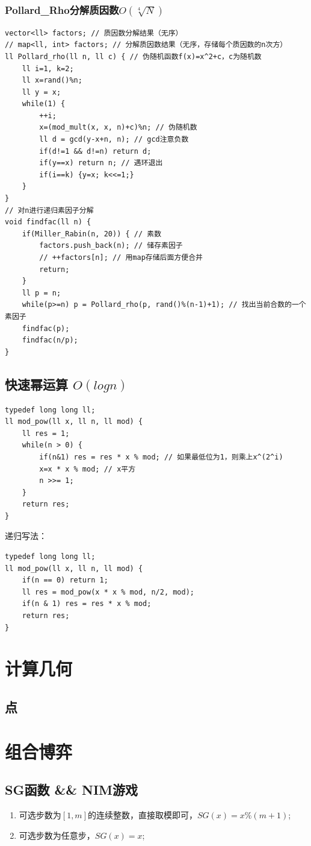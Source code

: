 \documentclass[a4paper]{ctexrep}
\begin{document}
\subsection{Pollard\_Rho分解质因数$O(\sqrt[4] N)$}
\begin{lstlisting}
vector<ll> factors; // 质因数分解结果（无序）
// map<ll, int> factors; // 分解质因数结果（无序，存储每个质因数的n次方）
ll Pollard_rho(ll n, ll c) { // 伪随机函数f(x)=x^2+c，c为随机数
	ll i=1, k=2;
	ll x=rand()%n;
	ll y = x;
	while(1) {
		++i;
		x=(mod_mult(x, x, n)+c)%n; // 伪随机数
		ll d = gcd(y-x+n, n); // gcd注意负数
		if(d!=1 && d!=n) return d;
		if(y==x) return n; // 遇环退出
		if(i==k) {y=x; k<<=1;}
	}
}
// 对n进行递归素因子分解
void findfac(ll n) {
	if(Miller_Rabin(n, 20)) { // 素数
		factors.push_back(n); // 储存素因子
		// ++factors[n]; // 用map存储后面方便合并
		return;
	}
	ll p = n;
	while(p>=n) p = Pollard_rho(p, rand()%(n-1)+1); // 找出当前合数的一个素因子
	findfac(p);
	findfac(n/p);
}
\end{lstlisting}

\section{快速幂运算 $O(log n)$}
\begin{lstlisting}
typedef long long ll;
ll mod_pow(ll x, ll n, ll mod) {
	ll res = 1;
	while(n > 0) {
		if(n&1) res = res * x % mod; // 如果最低位为1，则乘上x^(2^i)
		x=x * x % mod; // x平方
		n >>= 1;
	}
	return res;
}
\end{lstlisting}

递归写法：
\begin{lstlisting}
typedef long long ll;
ll mod_pow(ll x, ll n, ll mod) {
	if(n == 0) return 1;
	ll res = mod_pow(x * x % mod, n/2, mod);
	if(n & 1) res = res * x % mod;
	return res;
}
\end{lstlisting}

\chapter{计算几何}
\section{点}


\chapter{组合博弈}
\section{SG函数 \&\& NIM游戏}
\begin{enumerate}
	\item 可选步数为$[1, m]$的连续整数，直接取模即可，$SG(x)=x\%(m+1)$;
	\item 可选步数为任意步，$SG(x)=x$;
\end{enumerate}
\end{document}
